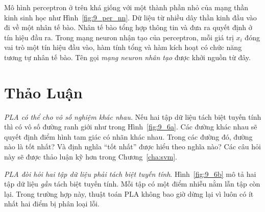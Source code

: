 


Mô hình perceptron ở trên khá giống với một thành phần nhỏ của mạng thần kinh
sinh học như Hình~\ref{fig:9_per_nn}. Dữ liệu từ nhiều dây thần kinh đầu vào đi
về một nhân tế bào. Nhân tế bào tổng hợp thông tin và đưa ra quyết định ở tín
hiệu đầu ra. Trong mạng neuron nhận tạo của perceptron, mỗi giá trị $x_i$ đóng
vai trò một tín hiệu đầu vào, hàm tính tổng và hàm kích hoạt có chức năng tương
tự nhân tế bào. Tên gọi \textit{mạng neuron nhân tạo} được khởi nguồn từ đây.



\section{Thảo Luận}

\textit{PLA có thể cho vô số nghiệm khác nhau.}
Nếu hai tập dữ liệu tách biệt tuyến tính thì có vô số đường ranh giới như trong Hình~\ref{fig:9_6a}. Các đường khác nhau sẽ
quyết định điểm hình tam giác có nhãn khác nhau. Trong các đường đó, đường
nào là tốt nhất? Và định nghĩa ``tốt nhất'' được hiểu theo nghĩa nào? Các câu hỏi này sẽ được thảo luận kỹ hơn trong Chương~\ref{cha:svm}.


\textit{PLA đòi hỏi hai tập dữ liệu phải tách biệt tuyến tính}.
Hình~\ref{fig:9_6b} mô tả hai tập dữ liệu \textit{gần} tách biệt tuyến tính. Mỗi tập có một điểm {nhiễu} nằm lẫn tập còn lại. Trong trường hợp này, thuật toán PLA không bao giờ dừng lại vì luôn có ít nhất hai điểm bị phân loại lỗi.



